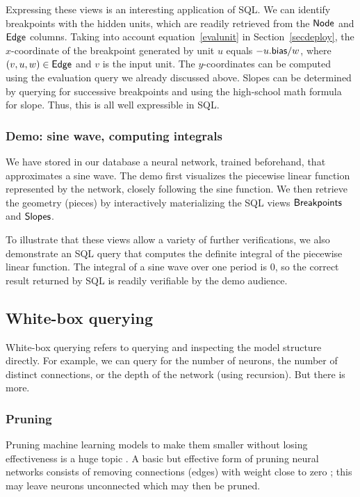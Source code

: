 \documentclass{article}
\begin{document}
Expressing these views is an interesting application of SQL\@.
We can identify breakpoints with the hidden units, which are
readily retrieved from the $\sf Node$ and $\sf Edge$ columns.
Taking into account equation~\ref{evalunit} in
Section~\ref{secdeploy}, the $x$-coordinate of the
breakpoint generated by unit $u$ equals $-u.{\sf bias}/w$, where
$(v,u,w) \in {\sf Edge}$ and $v$ is the input unit.  The
$y$-coordinates can be computed using the evaluation query we
already discussed above.  Slopes can be determined by querying
for successive breakpoints and using the high-school math formula
for slope.  Thus, this is all well expressible in SQL.

\subsubsection*{Demo: sine wave, computing integrals}

We have stored in our database a neural network, trained
beforehand, that approximates a sine wave.  The demo first
visualizes the piecewise linear function represented by the
network, closely following the sine function.  We then 
retrieve the geometry (pieces) by interactively
materializing the SQL views $\sf Breakpoints$ and $\sf Slopes$.

To illustrate that these views allow a variety of further
verifications, we also demonstrate an SQL query that computes the
definite integral of the piecewise linear function.  The integral
of a sine wave over one period is 0, so the correct result
returned by SQL is readily verifiable by the demo audience.

\subsection{White-box querying}

White-box querying refers to querying and inspecting the model structure
directly.  For example, we can query for
the number of neurons, the number of distinct connections, or
the depth of the network (using recursion). But there is more.

\subsubsection*{Pruning}

Pruning machine learning models to make them smaller without losing
effectiveness is a huge topic \cite{pruning101}.  A basic but
effective form of pruning neural networks
consists of removing connections (edges) with weight
close to zero \cite{pruning-nn}; this may leave neurons
unconnected which may then be pruned.
\end{document}
